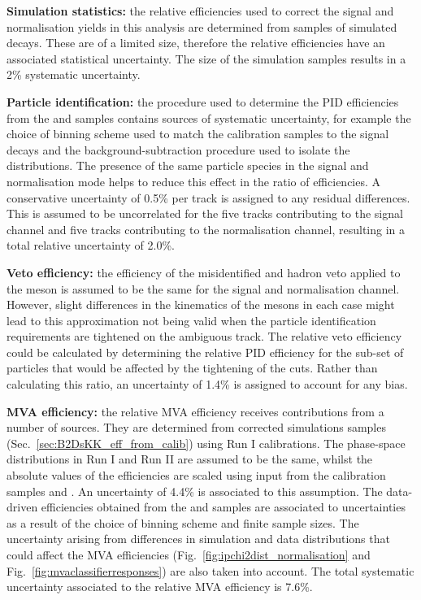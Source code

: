 \begin{description}
\item \textbf{Simulation statistics:} the relative efficiencies used to correct the signal and normalisation yields in this analysis are determined from samples of simulated decays. These are of a limited size, therefore the relative efficiencies have an associated statistical uncertainty. The size of the simulation samples results in a 2\% systematic uncertainty. 

\item \textbf{Particle identification:} the procedure used to determine the PID efficiencies from the \Dz and \Lc samples contains sources of systematic uncertainty, for example the choice of binning scheme used to match the calibration samples to the signal decays and the background-subtraction procedure used to isolate the distributions. The presence of the same particle species in the signal and normalisation mode helps to reduce this effect in the ratio of efficiencies. A conservative uncertainty of 0.5\% per track is assigned to any residual differences. This is assumed to be uncorrelated for the five tracks contributing to the signal channel and five tracks contributing to the normalisation channel, resulting in a total relative uncertainty of 2.0\%.

\item \textbf{Veto efficiency:} the efficiency of the misidentified \D and \Lc hadron veto applied to the \Dsp meson is assumed to be the same for the signal and normalisation channel. However, slight differences in the kinematics of the \Dsp mesons in each case might lead to this approximation not being valid when the particle identification requirements are tightened on the ambiguous track. The relative veto efficiency could be calculated by determining the relative PID efficiency for the sub-set of particles that would be affected by the tightening of the cuts. Rather than calculating this ratio, an uncertainty of 1.4\% is assigned to account for any bias.   

\item \textbf{MVA efficiency:} the relative MVA efficiency receives contributions from a number of sources.
They are determined from corrected simulations samples (Sec.~\ref{sec:B2DsKK_eff_from_calib}) using Run I calibrations. The phase-space distributions in Run I and Run II are assumed to be the same, whilst the absolute values of the efficiencies are scaled using input from the calibration samples \decay{\Bs}{\jpsi\phiz} and \decay{\Bsb}{\Dsp\pim}. An uncertainty of 4.4\% is associated to this assumption. 
The data-driven efficiencies obtained from the \decay{\Bs}{\jpsi\phiz} and \decay{\Bsb}{\Dsp\pim} samples are associated to uncertainties as a result of the choice of binning scheme and finite sample sizes. 
The uncertainty arising from differences in simulation and data distributions that could affect the MVA efficiencies (Fig.~\ref{fig:ipchi2dist_normalisation} and Fig.~\ref{fig:mvaclassifierresponses}) are also taken into account.
The total systematic uncertainty associated to the relative MVA efficiency is 7.6\%. 



\end{description}
